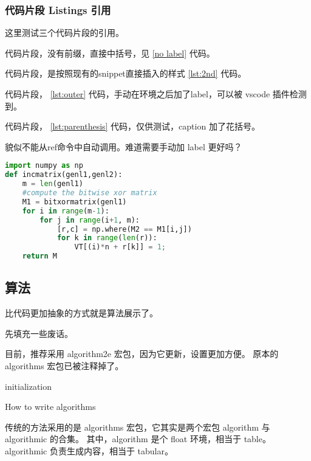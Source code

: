 \documentclass[../Main/thesis]{subfiles}
\begin{document}
\subsubsection{代码片段 Listings 引用}

这里测试三个代码片段的引用。

代码片段，没有前缀，直接中括号，见 \ref{no label} 代码。

代码片段，是按照现有的snippet直接插入的样式 \ref{lst:2nd} 代码。

代码片段， \ref{lst:outer} 代码，手动在环境之后加了label，可以被 vscode 插件检测到。

代码片段， \ref{lst:parenthesis} 代码，仅供测试，caption 加了花括号。

貌似不能从ref命令中自动调用。难道需要手动加 label 更好吗？
\begin{lstlisting}[language=Python,
  caption={Must have Parenthesis},
  label=lst:parenthesis]
import numpy as np
def incmatrix(genl1,genl2):
    m = len(genl1)
    #compute the bitwise xor matrix
    M1 = bitxormatrix(genl1)
    for i in range(m-1):
        for j in range(i+1, m):
            [r,c] = np.where(M2 == M1[i,j])
            for k in range(len(r)):
                VT[(i)*n + r[k]] = 1;
    return M
\end{lstlisting}
\subsection{算法}
\label{ssc:algo}

比代码更加抽象的方式就是算法展示了。

先填充一些废话。\zhlipsum[7]

目前，推荐采用 algorithm2e 宏包，因为它更新，设置更加方便。
原本的 algorithms 宏包已被注释掉了。

\begin{algorithm}[htbp]
  \SetAlgoLined
  initialization\;
  \caption{How to write algorithms}
  \label{alg:test}
\end{algorithm}

传统的方法采用的是 algorithms 宏包，它其实是两个宏包 algorithm 与 algorithmic 的合集。
其中，algorithm 是个 float 环境，相当于 table。
algorithmic 负责生成内容，相当于 tabular。
\end{document}
